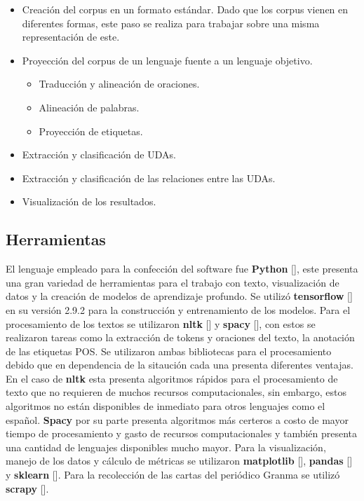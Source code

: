 \begin{itemize}
    \item Creación del corpus en un formato estándar. Dado que los corpus vienen en diferentes formas, este paso se realiza para trabajar sobre una misma representación de este.
    \item Proyección del corpus de un lenguaje fuente a un lenguaje objetivo.
    \begin{itemize}
        \item Traducción y alineación de oraciones.
        \item Alineación de palabras.
        \item Proyección de etiquetas.
    \end{itemize}
    \item Extracción y clasificación de UDAs.
    \item Extracción y clasificación de las relaciones entre las UDAs.
    \item Visualización de los resultados.
\end{itemize}

\subsection{Herramientas}

El lenguaje empleado para la confección del software fue \textbf{Python} [\cite{python}], este presenta 
una gran variedad de herramientas 
para el trabajo con texto, visualización de datos y la creación de modelos de aprendizaje profundo.
Se utilizó \textbf{tensorflow} [\cite{tensorflow}] en su versión 2.9.2 para la construcción y entrenamiento de los modelos. 
Para el procesamiento de los textos se utilizaron \textbf{nltk} [\cite{nltk}] y \textbf{spacy} [\cite{spacy}], con estos se realizaron tareas
como la extracción de tokens y oraciones del texto, la anotación de las etiquetas POS. Se utilizaron 
ambas bibliotecas para el procesamiento debido que en dependencia de la sitaución cada una presenta diferentes
ventajas. En el caso de \textbf{nltk} esta presenta algoritmos rápidos para el procesamiento de texto que no 
requieren de muchos recursos computacionales, sin embargo, estos algoritmos no están disponibles de inmediato
para otros lenguajes como el español. \textbf{Spacy} por su parte presenta algoritmos más certeros a costo 
de mayor tiempo de procesamiento y gasto de recursos computacionales y también presenta una cantidad de lenguajes 
disponibles mucho mayor. Para la visualización, manejo de los datos y cálculo de métricas se utilizaron 
\textbf{matplotlib} [\cite{matplotlib}], \textbf{pandas} [\cite{pandas}] y \textbf{sklearn} [\cite{sklearn}]. 
Para la recolección de las cartas del periódico Granma se utilizó \textbf{scrapy} [\cite{scrapy}].

